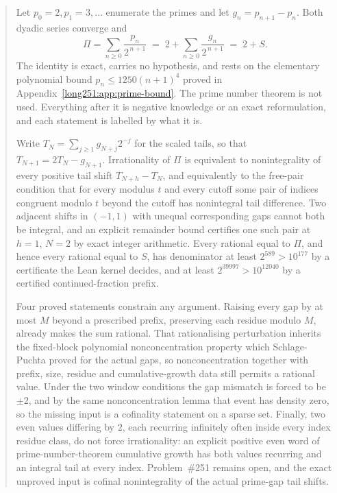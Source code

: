 \maketitle
\noteprovenance

\begin{abstract}
\noindent
Let $p_0=2,p_1=3,\ldots$ enumerate the primes and let $g_n=p_{n+1}-p_n$.  Both
dyadic series converge and
\[
 \Pi=\sum_{n\ge0}\frac{p_n}{2^{\,n+1}}
 \;=\;2+\sum_{n\ge0}\frac{g_n}{2^{\,n+1}}\;=\;2+S .
\]
The identity is exact, carries no hypothesis, and rests on the elementary
polynomial bound $p_n\le1250(n+1)^4$ proved in Appendix~\ref{long251:app:prime-bound}.
The prime number theorem is not used.  Everything after it is negative
knowledge or an exact reformulation, and each statement is labelled by what it
is.

Write $T_N=\sum_{j\ge1}g_{N+j}2^{-j}$ for the scaled tails, so that
$T_{N+1}=2T_N-g_{N+1}$.  Irrationality of $\Pi$ is equivalent to
nonintegrality of every positive tail shift $T_{N+h}-T_N$, and equivalently to
the free-pair condition that for every modulus $t$ and every cutoff some pair
of indices congruent modulo $t$ beyond the cutoff has nonintegral tail
difference.  Two adjacent shifts in $(-1,1)$ with unequal corresponding gaps
cannot both be integral, and an explicit remainder bound certifies one such
pair at $h=1$, $N=2$ by exact integer arithmetic.  Every rational equal to
$\Pi$, and hence every rational equal to $S$, has denominator at least
$2^{589}>10^{177}$ by a certificate the Lean kernel decides, and at least
$2^{39997}>10^{12040}$ by a certified continued-fraction prefix.

Four proved statements constrain any argument.  Raising every gap by at most
$M$ beyond a prescribed prefix, preserving each residue modulo $M$, already
makes the sum rational.  That rationalising perturbation inherits the
fixed-block polynomial nonconcentration property which Schlage-Puchta proved
for the actual gaps, so nonconcentration together with prefix, size, residue
and cumulative-growth data still permits a rational value.  Under the two
window conditions the gap mismatch is forced to be $\pm2$, and by the same
nonconcentration lemma that event has density zero, so the missing input is a
cofinality statement on a sparse set.  Finally, two even values differing by
$2$, each recurring infinitely often inside every index residue class, do not
force irrationality: an explicit positive even word of prime-number-theorem
cumulative growth has both values recurring and an integral tail at every
index.  Problem~\#251 remains open, and the exact unproved input is cofinal
nonintegrality of the actual prime-gap tail shifts.
\end{abstract}

